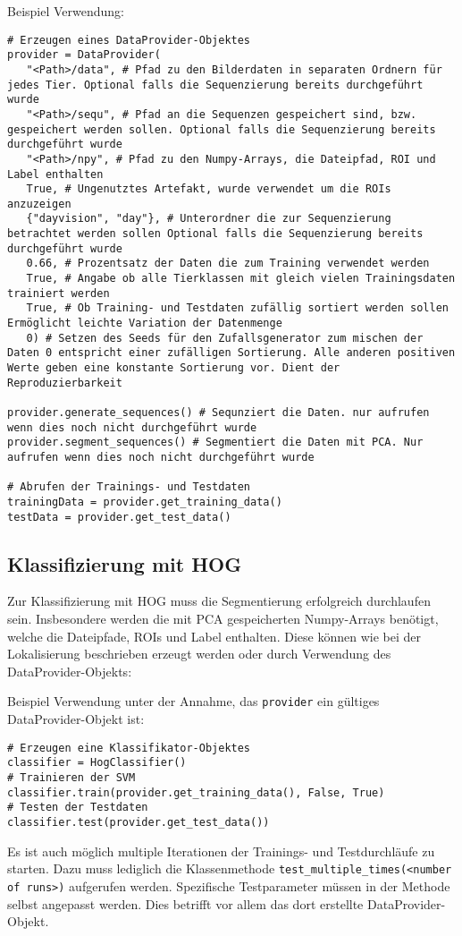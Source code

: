 Beispiel Verwendung:
\begin{verbatim}
# Erzeugen eines DataProvider-Objektes
provider = DataProvider(
   "<Path>/data", # Pfad zu den Bilderdaten in separaten Ordnern für jedes Tier. Optional falls die Sequenzierung bereits durchgeführt wurde
   "<Path>/sequ", # Pfad an die Sequenzen gespeichert sind, bzw. gespeichert werden sollen. Optional falls die Sequenzierung bereits durchgeführt wurde
   "<Path>/npy", # Pfad zu den Numpy-Arrays, die Dateipfad, ROI und Label enthalten
   True, # Ungenutztes Artefakt, wurde verwendet um die ROIs anzuzeigen
   {"dayvision", "day"}, # Unterordner die zur Sequenzierung betrachtet werden sollen Optional falls die Sequenzierung bereits durchgeführt wurde
   0.66, # Prozentsatz der Daten die zum Training verwendet werden
   True, # Angabe ob alle Tierklassen mit gleich vielen Trainingsdaten trainiert werden
   True, # Ob Training- und Testdaten zufällig sortiert werden sollen Ermöglicht leichte Variation der Datenmenge
   0) # Setzen des Seeds für den Zufallsgenerator zum mischen der Daten 0 entspricht einer zufälligen Sortierung. Alle anderen positiven Werte geben eine konstante Sortierung vor. Dient der Reproduzierbarkeit

provider.generate_sequences() # Sequnziert die Daten. nur aufrufen wenn dies noch nicht durchgeführt wurde
provider.segment_sequences() # Segmentiert die Daten mit PCA. Nur aufrufen wenn dies noch nicht durchgeführt wurde

# Abrufen der Trainings- und Testdaten
trainingData = provider.get_training_data()
testData = provider.get_test_data()
\end{verbatim}
 

\subsection*{Klassifizierung mit HOG}
Zur Klassifizierung mit HOG muss die Segmentierung erfolgreich durchlaufen sein. Insbesondere werden die mit PCA gespeicherten Numpy-Arrays benötigt, welche die Dateipfade, ROIs und Label enthalten. Diese können wie bei der Lokalisierung beschrieben erzeugt werden oder durch Verwendung des DataProvider-Objekts:

Beispiel Verwendung unter der Annahme, das \texttt{provider} ein gültiges DataProvider-Objekt ist:

\begin{verbatim}
# Erzeugen eine Klassifikator-Objektes
classifier = HogClassifier()
# Trainieren der SVM
classifier.train(provider.get_training_data(), False, True)
# Testen der Testdaten
classifier.test(provider.get_test_data())
\end{verbatim}
Es ist auch möglich multiple Iterationen der Trainings- und Testdurchläufe zu starten. Dazu muss lediglich die Klassenmethode \texttt{test\_multiple\_times(<number of runs>)} aufgerufen werden. Spezifische Testparameter müssen in der Methode selbst angepasst werden. Dies betrifft vor allem das dort erstellte DataProvider-Objekt.



